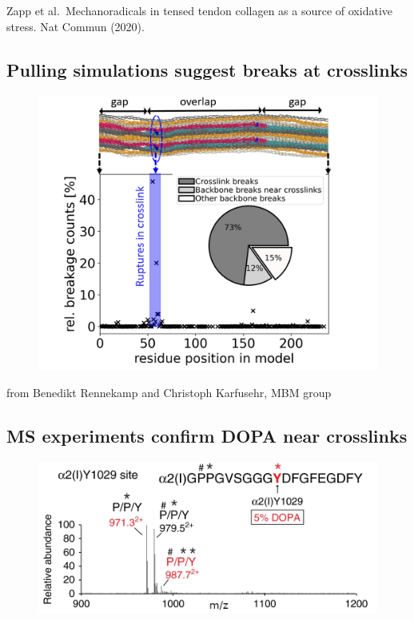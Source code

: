 \documentclass[
  letterpaper,
  DIV=11,
  numbers=noendperiod]{scrartcl}
\begin{document}
Zapp et al.~Mechanoradicals in tensed tendon collagen as a source of
oxidative stress. Nat Commun (2020).

\hypertarget{pulling-simulations-suggest-breaks-at-crosslinks}{%
\subsection{Pulling simulations suggest breaks at
crosslinks}\label{pulling-simulations-suggest-breaks-at-crosslinks}}

\begin{figure}

{\centering \includegraphics{www/WhereBreak.png}

}

\end{figure}

from Benedikt Rennekamp and Christoph Karfusehr, MBM group

\hypertarget{ms-experiments-confirm-dopa-near-crosslinks}{%
\subsection{MS experiments confirm DOPA near
crosslinks}\label{ms-experiments-confirm-dopa-near-crosslinks}}

\begin{figure}

{\centering \includegraphics{www/DOPA_MS.png}

}

\end{figure}
\end{document}
